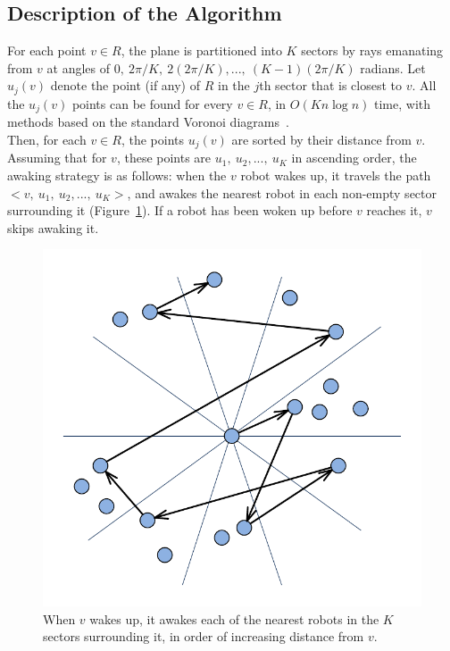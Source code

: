 \documentclass[review]{elsarticle}
\begin{document}
\subsection{Description of the Algorithm}
For each point $v\in R$, the plane is partitioned into $K$ sectors by rays emanating from $v$ at angles of
$0, ~2\pi/K, ~2(2\pi/K), ..., ~(K-1)(2\pi/K)$ radians.
Let $u_j(v)$ denote the point (if any) of $R$ in the $j$th sector that is closest to $v$.
All the $u_j(v)$ points can be found for every $v\in R$, in $O(Kn\log n)$ time, with methods based on the standard Voronoi diagrams~\cite{Clarkson1987}.\\
Then, for each $v\in R$, the points $u_j(v)$ are sorted by their distance from $v$. Assuming that for $v$, these points are ${ u_1,~u_2,...,~u_K }$ in ascending order, the awaking strategy is as follows: when the $v$ robot wakes up, it travels the path ${ <v,~u_1,~u_2,...,~u_K> }$, and awakes the nearest robot in each non-empty sector surrounding it (Figure~\ref{fig:thetagraph}). If a robot has been woken up before $v$ reaches it, $v$ skips awaking it.
\begin{figure} [h]
  \vspace{-10pt}
  \centering
  \includegraphics[scale=.5]{Figs/fig2.pdf}
  \vspace{-20pt}
  \caption{When $v$ wakes up, it awakes each of the nearest robots in the $K$ sectors surrounding it, in order of increasing distance from $v$.}
  \label{fig:thetagraph}
\end{figure}
\end{document}
